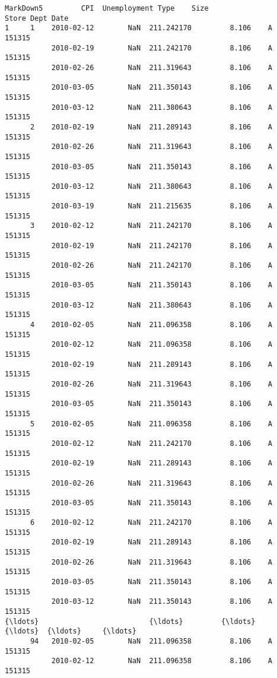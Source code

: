 \documentclass[11pt]{article}
\begin{document}
\begin{Verbatim}[commandchars=\\\{\}]
                       MarkDown5         CPI  Unemployment Type    Size  
Store Dept Date                                                          
1     1    2010-02-12        NaN  211.242170         8.106    A  151315  
           2010-02-19        NaN  211.242170         8.106    A  151315  
           2010-02-26        NaN  211.319643         8.106    A  151315  
           2010-03-05        NaN  211.350143         8.106    A  151315  
           2010-03-12        NaN  211.380643         8.106    A  151315  
      2    2010-02-19        NaN  211.289143         8.106    A  151315  
           2010-02-26        NaN  211.319643         8.106    A  151315  
           2010-03-05        NaN  211.350143         8.106    A  151315  
           2010-03-12        NaN  211.380643         8.106    A  151315  
           2010-03-19        NaN  211.215635         8.106    A  151315  
      3    2010-02-12        NaN  211.242170         8.106    A  151315  
           2010-02-19        NaN  211.242170         8.106    A  151315  
           2010-02-26        NaN  211.242170         8.106    A  151315  
           2010-03-05        NaN  211.350143         8.106    A  151315  
           2010-03-12        NaN  211.380643         8.106    A  151315  
      4    2010-02-05        NaN  211.096358         8.106    A  151315  
           2010-02-12        NaN  211.096358         8.106    A  151315  
           2010-02-19        NaN  211.289143         8.106    A  151315  
           2010-02-26        NaN  211.319643         8.106    A  151315  
           2010-03-05        NaN  211.350143         8.106    A  151315  
      5    2010-02-05        NaN  211.096358         8.106    A  151315  
           2010-02-12        NaN  211.242170         8.106    A  151315  
           2010-02-19        NaN  211.289143         8.106    A  151315  
           2010-02-26        NaN  211.319643         8.106    A  151315  
           2010-03-05        NaN  211.350143         8.106    A  151315  
      6    2010-02-12        NaN  211.242170         8.106    A  151315  
           2010-02-19        NaN  211.289143         8.106    A  151315  
           2010-02-26        NaN  211.319643         8.106    A  151315  
           2010-03-05        NaN  211.350143         8.106    A  151315  
           2010-03-12        NaN  211.350143         8.106    A  151315  
{\ldots}                          {\ldots}         {\ldots}           {\ldots}  {\ldots}     {\ldots}  
      94   2010-02-05        NaN  211.096358         8.106    A  151315  
           2010-02-12        NaN  211.096358         8.106    A  151315  

\end{Verbatim}
\end{document}
